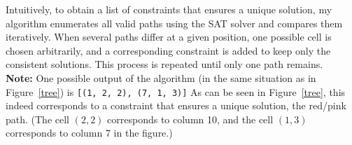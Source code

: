 \documentclass[a4paper, 11pt, oneside]{article}
\begin{document}
Intuitively, to obtain a list of constraints that ensures a unique solution, my
algorithm enumerates all valid paths using the SAT solver and compares them iteratively.
When several paths differ at a given position, one possible cell is chosen arbitrarily,
and a corresponding constraint is added to keep only the consistent solutions.
This process is repeated until only one path remains.
\\

\noindent\textbf{Note:} One possible output of the algorithm (in the same situation
as in Figure~\ref{tree}) is \texttt{[(1, 2, 2), (7, 1, 3)]} 
As can be seen in Figure~\ref{tree}, this indeed corresponds to a constraint that
ensures a unique solution, the red/pink path.
(The cell $(2,2)$ corresponds to column 10, and the cell $(1,3)$ corresponds to
column 7 in the figure.)
\end{document}
